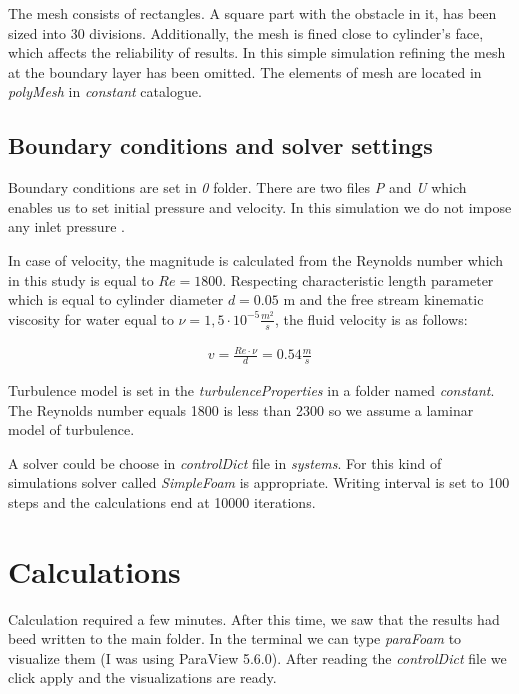 \documentclass[a4paper,11pt]{article}
\begin{document}
The mesh consists of rectangles. A square part with the obstacle in it, has been sized into 30 divisions. Additionally, the mesh is fined close to cylinder's face, which affects the reliability of results. In this simple simulation refining the mesh at the boundary layer has been omitted. The elements of mesh are located in \emph{polyMesh} in \emph{constant} catalogue.
	
\subsection{Boundary conditions and solver settings}

Boundary conditions are set in \emph{0} folder. There are two files \emph{P} and \emph{U} which enables us to set initial pressure and velocity. In this simulation we do not impose any inlet pressure .

In case of velocity, the magnitude is calculated from the Reynolds number which in this study is equal to $Re = 1800$. Respecting characteristic length parameter which is equal to cylinder diameter $d=0.05 $ m and the free stream kinematic viscosity for water equal to $\nu=1,5\cdot10^{-5}\frac{m^{2}}{s}$, the fluid velocity is as follows:

\begin{gather*}
    v = \frac{Re\cdot\nu}{d} = 0.54 \frac{m}{s}
\end{gather*}

Turbulence model is set in the \emph{turbulenceProperties} in a folder named \emph{constant}. The Reynolds number equals 1800 is less than 2300 so we assume a laminar model of turbulence.
		
A solver could be choose in \emph{controlDict} file in \emph{systems}. For this kind of simulations solver called \emph{SimpleFoam} is appropriate. Writing interval is set to 100 steps and the calculations end at 10000 iterations.

\newpage

\section{Calculations}

Calculation required a few minutes. After this time, we saw that the results had beed written to the main folder. In the terminal we can type \emph{paraFoam} to visualize them (I was using ParaView 5.6.0). After reading the \emph{controlDict} file we click apply and the visualizations are ready.
\end{document}

